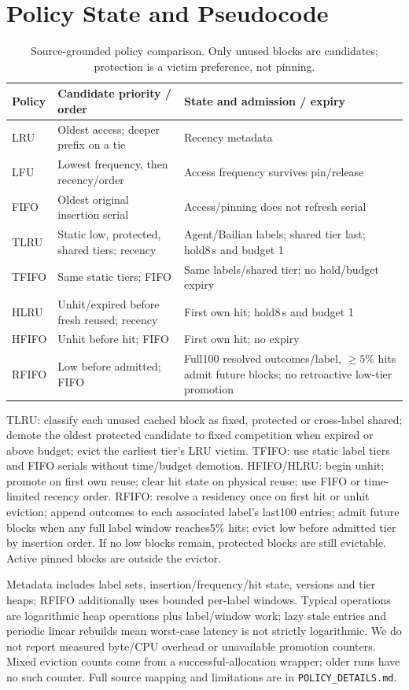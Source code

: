 \documentclass{article}
\begin{document}
\section{Policy State and Pseudocode}
\begin{table}[t]\centering\small
\caption{Source-grounded policy comparison. Only unused blocks are candidates; protection is a victim preference, not pinning.}
\begin{tabular}{lp{}p{}}\toprule
Policy & Candidate priority / order & State and admission / expiry\\\midrule
LRU & Oldest access; deeper prefix on a tie & Recency metadata\\
LFU & Lowest frequency, then recency/order & Access frequency survives pin/release\\
FIFO & Oldest original insertion serial & Access/pinning does not refresh serial\\
TLRU & Static low, protected, shared tiers; recency & Agent/Bailian labels; shared tier last; hold8\,s and budget 1\\
TFIFO & Same static tiers; FIFO & Same labels/shared tier; no hold/budget expiry\\
HLRU & Unhit/expired before fresh reused; recency & First own hit; hold8\,s and budget 1\\
HFIFO & Unhit before hit; FIFO & First own hit; no expiry\\
RFIFO & Low before admitted; FIFO & Full100 resolved outcomes/label, $\ge5\%$ hits admit future blocks; no retroactive low-tier promotion\\\bottomrule
\end{tabular}\end{table}
TLRU: classify each unused cached block as fixed, protected or cross-label shared; demote the oldest protected candidate to fixed competition when expired or above budget; evict the earliest tier's LRU victim. TFIFO: use static label tiers and FIFO serials without time/budget demotion. HFIFO/HLRU: begin unhit; promote on first own reuse; clear hit state on physical reuse; use FIFO or time-limited recency order. RFIFO: resolve a residency once on first hit or unhit eviction; append outcomes to each associated label's last100 entries; admit future blocks when any full label window reaches5\% hits; evict low before admitted tier by insertion order. If no low blocks remain, protected blocks are still evictable. Active pinned blocks are outside the evictor.

Metadata includes label sets, insertion/frequency/hit state, versions and tier heaps; RFIFO additionally uses bounded per-label windows. Typical operations are logarithmic heap operations plus label/window work; lazy stale entries and periodic linear rebuilds mean worst-case latency is not strictly logarithmic. We do not report measured byte/CPU overhead or unavailable promotion counters. Mixed eviction counts come from a successful-allocation wrapper; older runs have no such counter. Full source mapping and limitations are in \texttt{POLICY\_DETAILS.md}.
\end{document}
